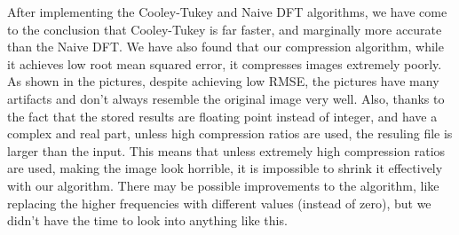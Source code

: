 After implementing the Cooley-Tukey and Naive DFT algorithms, we have come to the conclusion that Cooley-Tukey is far faster, and marginally more accurate than the Naive DFT. We have also found that our compression algorithm, while it achieves low root mean squared error, it compresses images extremely poorly. As shown in the pictures, despite achieving low RMSE, the pictures have many artifacts and don't always resemble the original image very well. Also, thanks to the fact that the stored results are floating point instead of integer, and have a complex and real part, unless high compression ratios are used, the resuling file is larger than the input. This means that unless extremely high compression ratios are used, making the image look horrible, it is impossible to shrink it effectively with our algorithm. There may be possible improvements to the algorithm, like replacing the higher frequencies with different values (instead of zero), but we didn't have the time to look into anything like this.

